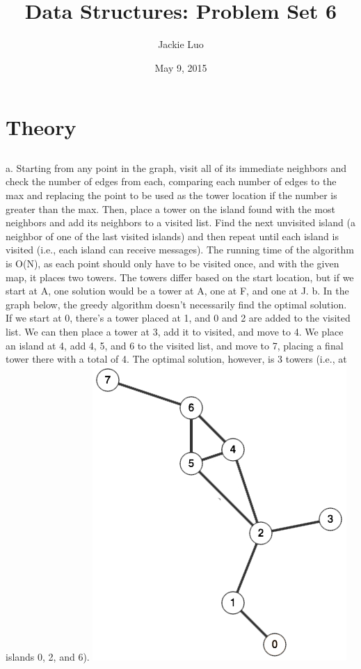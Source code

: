 \documentclass{article}
\title{Data Structures: Problem Set 6}
\author{Jackie Luo}
\date{May 9, 2015}
\begin{document}
\maketitle

\section{Theory}

\subsection{}
a. Starting from any point in the graph, visit all of its immediate neighbors and check the number of edges from each, comparing each number of edges to the max and replacing the point to be used as the tower location if the number is greater than the max. Then, place a tower on the island found with the most neighbors and add its neighbors to a visited list. Find the next unvisited island (a neighbor of one of the last visited islands) and then repeat until each island is visited (i.e., each island can receive messages). The running time of the algorithm is O(N), as each point should only have to be visited once, and with the given map, it places two towers. The towers differ based on the start location, but if we start at A, one solution would be a tower at A, one at F, and one at J.
\newline
b. In the graph below, the greedy algorithm doesn't necessarily find the optimal solution. If we start at 0, there's a tower placed at 1, and 0 and 2 are added to the visited list. We can then place a tower at 3, add it to visited, and move to 4. We place an island at 4, add 4, 5, and 6 to the visited list, and move to 7, placing a final tower there with a total of 4. The optimal solution, however, is 3 towers (i.e., at islands 0, 2, and 6). 
\newline
\includegraphics[scale=0.5]{map.png}
\end{document}
